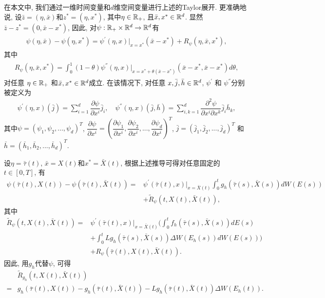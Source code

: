 在本文中, 我们通过一维时间变量和$d$维空间变量进行上述的Taylor展开. 更准确地说, 设$\bar{z}=(\eta,\bar{x})$和$z^{*}=(\eta,x^{*})$, 其中$\eta \in \mathbb{R}_{+}$, 且$\bar{x},x^{*}\in\mathbb{R}^{d}$. 显然$\bar{z}-z^{*}=(0,\bar{x}-x^{*})$, 因此, 对$\psi :\mathbb{R}_{+}\times \mathbb{R}^{d}\to \mathbb{R}^{d}$有
\begin{align*}
    \begin{split}
        \psi (\eta ,\bar{x})-\psi (\eta ,x^{*})=\psi ^{'}(\eta ,x)\big|_{x=x^{*}}(\bar{x}-x^{*})+R_{\psi }(\eta,\bar{x},x^{*}),
    \end{split}
\end{align*}
其中
\begin{align*}
    \begin{split}
        R_{\psi }(\eta,\bar{x},x^{*})=\int_{0}^{1}(1-\theta )\psi ^{''}(\eta,x)|_{x=x^{*}+\theta (\bar{x}-x^{*})}(\bar{x}-x^{*},\bar{x}-x^{*})d\theta ,
    \end{split}
\end{align*}
对任意 $\eta \in \mathbb{R}_{+}$ 和$\bar{x},x^{*}\in \mathbb{R}^{d}$成立. 在该情况下, 对任意 $x,\bar{j},\bar{h} \in \mathbb{R}^{d}$, $\psi ^{'}$ 和 $\psi ^{''}$分别被定义为
\begin{align*}
    \psi ^{'}(\eta,x)(\bar{j})=\sum_{i=1}^{d}\dfrac{\partial \psi  }{\partial x^{i}}\bar{j}_{i},
    \quad\psi^{''}(\eta,x)(\bar{j},\bar{h})=\sum_{i,k=1}^{d}\dfrac{\partial^{2} \psi  }{\partial x^{i}\partial x^{k}}\bar{j}_{i}\bar{h}_{k},
\end{align*}
其中$\psi =(\psi _{1},\psi _{2},...,\psi _{d})^{T}$, $\dfrac{\partial \psi }{\partial x^{i}}=(\dfrac{\partial \psi _{1}}{\partial x^{i}},\dfrac{\partial \psi _{2}}{\partial x^{i}},...,\dfrac{\partial \psi _{d}}{\partial x^{i}})^{T}$, $\bar{j}=(\bar{j}_{1},\bar{j}_{2},...,\bar{j}_{d})^{T}$ 和 $\bar{h}=(\bar{h}_{1},\bar{h}_{2},...,\bar{h}_{d})^{T}$.

设$\eta=\bar{\tau}(t)$, $\bar{x}=X(t)$和$x^{*}=\bar{X}(t)$, 根据上述推导可得对任意固定的$t\in [0,T]$, 有
\begin{align}
    \label{le210}
    \psi (\bar{\tau}(t),X(t))-\psi (\bar{\tau}(t),\bar{X}(t))
    =&\psi ^{'}(\bar{\tau}(t),x)\big|_{x=\bar{X}(t)}\int_{0}^{t}g_{h}(\bar{\tau}(s),\bar{X}(s))dW(E(s))\nonumber\\
    &+ \tilde{R}_{\psi }(t,X(t),\bar{X}(t)),
\end{align}
其中
\begin{align}
    \label{the2_11}
    \tilde{R}_{\psi }(t,X(t),\bar{X}(t))
    =&\psi ^{'}(\bar{\tau}(t),x)\big|_{x=\bar{X}(t)}\bigg(\int_{0}^{t}f_{h}(\bar{\tau}(s),\bar{X}(s))dE(s)\nonumber\\
    &+\int_{0}^{t}Lg_{h}(\bar{\tau}(s),\bar{X}(s))\Delta W(E_{h}(s))dW(E(s))\bigg)\nonumber\\
    &+R_{\psi }(\bar{\tau}(t),X(t),\bar{X}(t)).
\end{align}
因此, 用$g_{h}$代替$\psi $, 可得
\begin{align}
    \label{the2_12}
    &\tilde{R}_{g_{h}}(t,X(t),\bar{X}(t)) \nonumber\\
    =&g_{h}(\bar{\tau}(t),X(t))-g_{h}(\bar{\tau}(t),\bar{X}(t))-Lg_{h}(\bar{\tau }(t),\bar{X}(t))\Delta W(E_{h}(t)).
\end{align}

